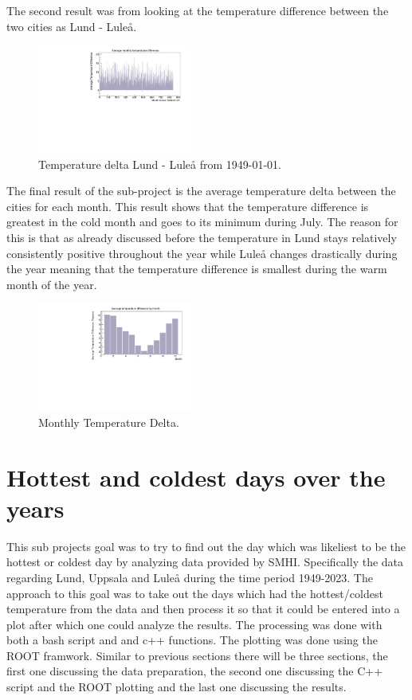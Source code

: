 \documentclass[aps,prl,groupedaddress,twocolumn]{revtex4-1}
\begin{document}
The second result was from looking at the temperature difference between the two cities as Lund - Luleå.
\begin{figure}[h!]
    \includegraphics[width=0.45\textwidth]{temperaturedeltaLundLulea.pdf}
    \caption{Temperature delta Lund - Luleå from 1949-01-01.}
    \label{fig:monthlyDelta}
\end{figure}
\vspace{-0.3cm}

The final result of the sub-project is the average temperature delta between the cities for each month. This result shows that the temperature difference is greatest in the cold month and goes to its minimum during July. The reason for this is that as already discussed before the temperature in Lund stays relatively consistently positive throughout the year while Luleå changes drastically during the year meaning that the temperature difference is smallest during the warm month of the year.
\begin{figure}[h!]
    \includegraphics[width=0.45\textwidth]{tempDeltaByMonth.pdf}
    \caption{Monthly Temperature Delta.}
    \label{fig:tempDelta}
\end{figure}
\vspace{-0.8cm}


\section{Hottest and coldest days over the years}

This sub projects goal was to try to find out the day which was likeliest to be the hottest or coldest day by analyzing data provided by SMHI. Specifically the data regarding Lund, Uppsala and Luleå during the time period 1949-2023. The approach to this goal was to take out the days which had the hottest/coldest temperature from the data and then process it so that it could be entered into a plot after which one could analyze the results. The processing was done with both a bash script and  and c++ functions. The plotting was done using the ROOT framwork.
Similar to previous sections there will be three sections, the first one discussing the data preparation, the second one discussing the C++ script and the ROOT plotting and the last one discussing the results.
\vspace{-0.3cm}
\end{document}
